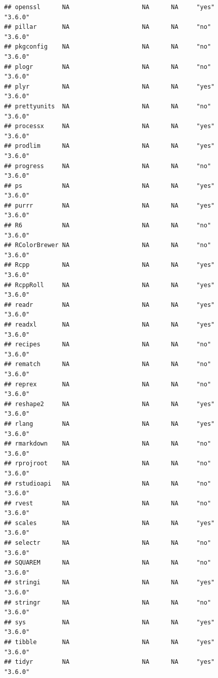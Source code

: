 \documentclass[]{article}
\begin{document}
\begin{verbatim}
## openssl      NA                    NA      NA     "yes"            "3.6.0"
## pillar       NA                    NA      NA     "no"             "3.6.0"
## pkgconfig    NA                    NA      NA     "no"             "3.6.0"
## plogr        NA                    NA      NA     "no"             "3.6.0"
## plyr         NA                    NA      NA     "yes"            "3.6.0"
## prettyunits  NA                    NA      NA     "no"             "3.6.0"
## processx     NA                    NA      NA     "yes"            "3.6.0"
## prodlim      NA                    NA      NA     "yes"            "3.6.0"
## progress     NA                    NA      NA     "no"             "3.6.0"
## ps           NA                    NA      NA     "yes"            "3.6.0"
## purrr        NA                    NA      NA     "yes"            "3.6.0"
## R6           NA                    NA      NA     "no"             "3.6.0"
## RColorBrewer NA                    NA      NA     "no"             "3.6.0"
## Rcpp         NA                    NA      NA     "yes"            "3.6.0"
## RcppRoll     NA                    NA      NA     "yes"            "3.6.0"
## readr        NA                    NA      NA     "yes"            "3.6.0"
## readxl       NA                    NA      NA     "yes"            "3.6.0"
## recipes      NA                    NA      NA     "no"             "3.6.0"
## rematch      NA                    NA      NA     "no"             "3.6.0"
## reprex       NA                    NA      NA     "no"             "3.6.0"
## reshape2     NA                    NA      NA     "yes"            "3.6.0"
## rlang        NA                    NA      NA     "yes"            "3.6.0"
## rmarkdown    NA                    NA      NA     "no"             "3.6.0"
## rprojroot    NA                    NA      NA     "no"             "3.6.0"
## rstudioapi   NA                    NA      NA     "no"             "3.6.0"
## rvest        NA                    NA      NA     "no"             "3.6.0"
## scales       NA                    NA      NA     "yes"            "3.6.0"
## selectr      NA                    NA      NA     "no"             "3.6.0"
## SQUAREM      NA                    NA      NA     "no"             "3.6.0"
## stringi      NA                    NA      NA     "yes"            "3.6.0"
## stringr      NA                    NA      NA     "no"             "3.6.0"
## sys          NA                    NA      NA     "yes"            "3.6.0"
## tibble       NA                    NA      NA     "yes"            "3.6.0"
## tidyr        NA                    NA      NA     "yes"            "3.6.0"

\end{verbatim}
\end{document}
